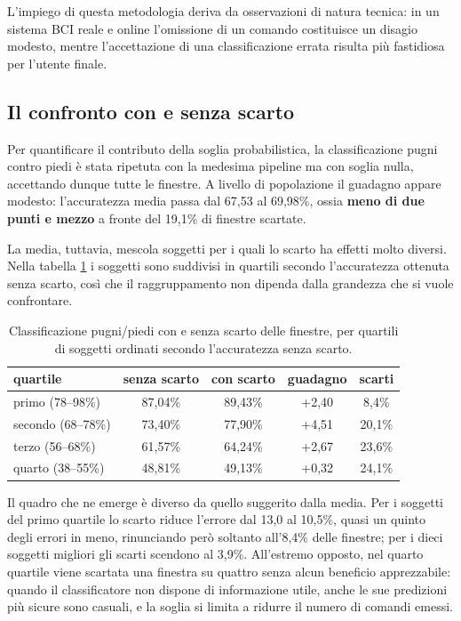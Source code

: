 L'impiego di questa metodologia deriva da osservazioni di natura tecnica: in un sistema BCI reale e online l'omissione di un comando costituisce un disagio modesto, mentre l'accettazione di una classificazione errata risulta più fastidiosa per l'utente finale.

\subsection{Il confronto con e senza scarto}
Per quantificare il contributo della soglia probabilistica, la classificazione pugni contro piedi è stata ripetuta con la medesima pipeline ma con soglia nulla, accettando dunque tutte le finestre. A livello di popolazione il guadagno appare modesto: l'accuratezza media passa dal 67,53 al 69,98\%, ossia \textbf{meno di due punti e mezzo} a fronte del 19,1\% di finestre scartate.

La media, tuttavia, mescola soggetti per i quali lo scarto ha effetti molto diversi. Nella tabella \ref{tab:scarto} i soggetti sono suddivisi in quartili secondo l'accuratezza ottenuta senza scarto, così che il raggruppamento non dipenda dalla grandezza che si vuole confrontare.

\begin{table}[htbp]
\centering
\begin{tabular}{lcccc}
\toprule
quartile & senza scarto & con scarto & guadagno & scarti \\
\midrule
primo (78--98\%)   & 87,04\% & 89,43\% & +2,40 &  8,4\% \\
secondo (68--78\%) & 73,40\% & 77,90\% & +4,51 & 20,1\% \\
terzo (56--68\%)   & 61,57\% & 64,24\% & +2,67 & 23,6\% \\
quarto (38--55\%)  & 48,81\% & 49,13\% & +0,32 & 24,1\% \\
\bottomrule
\end{tabular}
\caption{Classificazione pugni/piedi con e senza scarto delle finestre, per quartili di soggetti ordinati secondo l'accuratezza senza scarto.}
\label{tab:scarto}
\end{table}

Il quadro che ne emerge è diverso da quello suggerito dalla media. Per i soggetti del primo quartile lo scarto riduce l'errore dal 13,0 al 10,5\%, quasi un quinto degli errori in meno, rinunciando però soltanto all'8,4\% delle finestre; per i dieci soggetti migliori gli scarti scendono al 3,9\%. All'estremo opposto, nel quarto quartile viene scartata una finestra su quattro senza alcun beneficio apprezzabile: quando il classificatore non dispone di informazione utile, anche le sue predizioni più sicure sono casuali, e la soglia si limita a ridurre il numero di comandi emessi.


